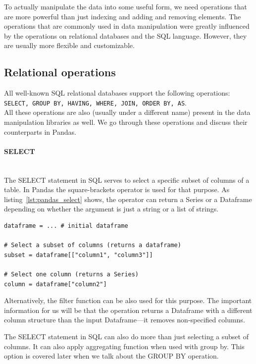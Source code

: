 To actually manipulate the data into some useful form, we need operations that are more powerful than just indexing and
adding and removing elements.
The operations that are commonly used in data manipulation were greatly influenced by the operations on relational
databases and the SQL language.
However, they are usually more flexible and customizable.

\subsection{Relational operations}

All well-known SQL relational databases support the following operations:
\texttt{SELECT, GROUP BY, HAVING, WHERE, JOIN, ORDER BY, AS}.
\\All these operations are also (usually under a different name) present in the data manipulation libraries as well.
We go through these operations and discuss their counterparts in Pandas.

\paragraph{SELECT} \leavevmode \\

The SELECT statement in SQL serves to select a specific subset of columns of a table.
In Pandas the square-brackets operator is used for that purpose.
As listing~\ref{lst:pandas_select} shows, the operator can return a Series or a Dataframe depending on whether
the argument is just a string or a list of strings.

\begin{lstlisting}[caption=Select in Pandas, label={lst:pandas_select}, captionpos=b]
dataframe = ... # initial dataframe

# Select a subset of columns (returns a dataframe)
subset = dataframe[["column1", "column3"]]

# Select one column (returns a Series)
column = dataframe["column2"]
\end{lstlisting}

Alternatively, the filter function can be also used for this purpose.
The important information for us will be that the operation returns a Dataframe with a different column structure
than the input Dataframe---it removes non-specified columns.

The SELECT statement in SQL can also do more than just selecting a subset of columns.
It can also apply aggregating function when used with group by.
This option is covered later when we talk about the GROUP BY operation.


